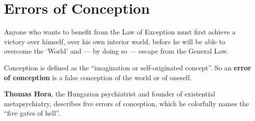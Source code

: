 \section{Errors of Conception}

\begin{quotex}
Anyone who wants to benefit from the Law of Exception must first achieve a victory over himself, over his own interior world, before he will be able to overcome the `World' and --- by doing so --- escape from the General Law.
\end{quotex}


Conception is defined as the ``imagination or self-originated concept''. So an \textbf{error of conception} is a false conception of the world or of oneself.

\textbf{Thomas Hora}, the Hungarian psychiatrist and founder of existential metapsychiatry, describes five errors of conception, which he colorfully names the ``five gates of hell''.

